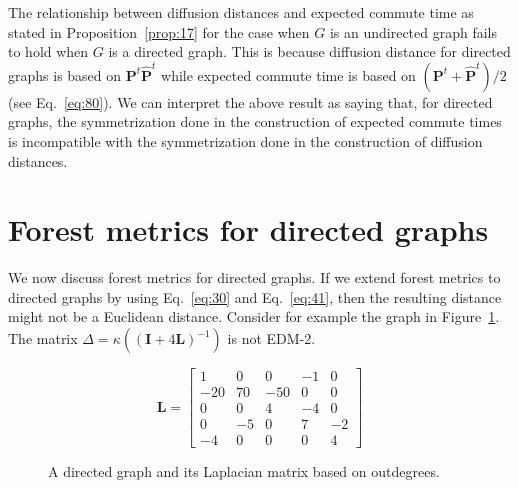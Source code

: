 The relationship between diffusion distances and expected commute time
as stated in Proposition~\ref{prop:17} for the case when $G$ is an
undirected graph fails to hold when $G$ is a directed graph. This is
because diffusion distance for directed graphs is based on
$\mathbf{P}^{t}\hat{\mathbf{P}}^{t}$ while expected commute time is
based on $(\mathbf{P}^{t} + \hat{\mathbf{P}}^{t})/2$ (see
Eq.~\eqref{eq:80}). We can interpret the above result as saying that,
for directed graphs, the symmetrization done in the construction of
expected commute times is incompatible with the symmetrization done in
the construction of diffusion distances.
\section{Forest metrics for directed graphs}
\label{sec:forest-metr-direct}
We now discuss forest metrics
\citep{chebotarev02:_fores_metric_for_graph_vertic} for directed
graphs. If we extend forest metrics to directed graphs by using
Eq.~\eqref{eq:30} and Eq.~\eqref{eq:41}, then the resulting distance
might not be a Euclidean distance. Consider for example the graph in
Figure~\ref{fig:directed_graph1}. The matrix $\Delta =
\kappa((\mathbf{I} + 4 \mathbf{L})^{-1})$ is not EDM-2.
\begin{figure}[hbtp]
  \centering
  \begin{minipage}[c]{0.45\textwidth}
    \centering
  \end{minipage}
  \begin{minipage}[c]{0.38\textwidth}
    \begin{equation*}
      \mathbf{L} = \left[ \begin{array}{rrrrr}
          1  & 0  & 0  & -1  & 0 \\
          -20 & 70  & -50  & 0 & 0 \\
          0  & 0 & 4  & -4 & 0 \\
          0 & -5 & 0  & 7 & -2 \\
          -4 & 0 & 0 & 0 & 4
        \end{array} \right ]
    \end{equation*}
  \end{minipage}
  \caption{A directed graph and its Laplacian matrix based on outdegrees.}
  \label{fig:directed_graph1}
\end{figure}

